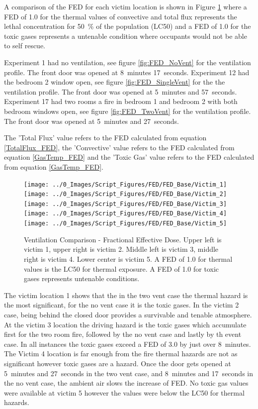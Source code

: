 \documentclass[12pt,oneside]{book}
\begin{document}
A comparison of the FED for each victim location is shown in Figure \ref{fig:FED_Base} where a FED of 1.0 for the thermal values of convective and total flux represents the lethal concentration for 50~\% of the population (LC50) and  a FED of 1.0 for the toxic gases represents a untenable condition where occupants would not be able to self rescue. 

Experiment 1 had no ventilation, see figure \ref{fig:FED_NoVent} for the ventilation profile. The front door was opened at 8~minutes 17~seconds. Experiment 12 had the bedroom 2 window open, see figure \ref{fig:FED_SingleVent} for the the ventilation profile. The front door was opened at 5~minutes and 57~seconds. Experiment 17 had two rooms a fire in bedroom 1 and bedroom 2 with both bedroom windows open, see figure \ref{fig:FED_TwoVent} for the ventilation profile. The front door was opened at 5~minutes and 27~seconds. 

The 'Total Flux' value refers to the FED calculated from equation \ref{TotalFlux_FED}, the 'Convective' value refers to the FED calculated from equation \ref{GasTemp_FED} and the 'Toxic Gas' value refers to the FED calculated from equation \ref{GasTemp_FED}.

\begin{figure}[H]
	\centering
	\texttt{[image: ../0\_Images/Script\_Figures/FED/FED\_Base/Victim\_1]}
	\texttt{[image: ../0\_Images/Script\_Figures/FED/FED\_Base/Victim\_2]}
	\texttt{[image: ../0\_Images/Script\_Figures/FED/FED\_Base/Victim\_3]}
	\texttt{[image: ../0\_Images/Script\_Figures/FED/FED\_Base/Victim\_4]}
	\texttt{[image: ../0\_Images/Script\_Figures/FED/FED\_Base/Victim\_5]}
	\caption[Ventilation Comparison - FED]{Ventilation Comparison - Fractional Effective Dose. Upper left is victim 1, upper right is victim 2. Middle left is victim 3, middle right is victim 4. Lower center is victim 5. A FED of 1.0 for thermal values is the LC50 for thermal exposure. A FED of 1.0 for toxic gases represents untenable conditions.}
	\label{fig:FED_Base}
\end{figure}

The victim location 1 shows that the in the two vent case the thermal hazard is the most significant, for the no vent case it is the toxic gases. In the victim 2 case, being behind the closed door provides a survivable and tenable atmosphere. At the victim 3 location the driving hazard is the toxic gases which accumulate first for the two room fire, followed by the no vent case and lastly by th event case. In all instances the toxic gases exceed a FED of 3.0 by just over 8~minutes. The Victim 4 location is far enough from the fire thermal hazards are not as significant however toxic gases are a hazard. Once the door gets opened at 5~minutes and 27~seconds in the two vent case, and 8~minutes and 17~seconds in the no vent case, the ambient air slows the increase of FED. No toxic gas values were available at victim 5 however the values were below the LC50 for thermal hazards. 
\end{document}
